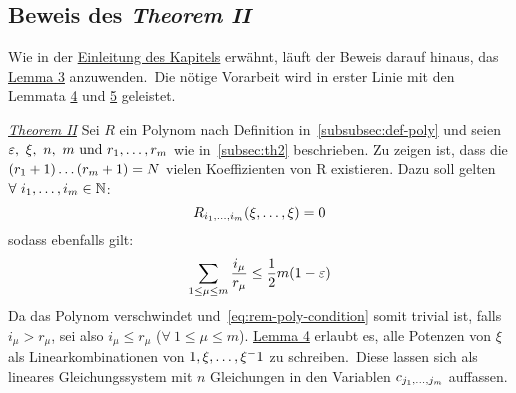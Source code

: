     \subsection{Beweis des \emph{Theorem II}}
        \label{subsec:proof-th2}
        \textrm{Wie in der \hyperref[sec:th2]{Einleitung des Kapitels} erwähnt, läuft der Beweis darauf hinaus, das
        \hyperref[subsec:lemma3]{Lemma 3} anzuwenden.\ Die nötige Vorarbeit wird in erster Linie mit den Lemmata
        \hyperref[subsec:lemma4]{4} und \hyperref[subsec:lemma5]{5} geleistet.}
        \begin{namedproof}{\emph{\hyperref[subsec:th2]{Theorem II}}}
            Sei $R$ ein Polynom nach Definition in~\ref{subsubsec:def-poly} und seien $\varepsilon,\ \xi,\ n,\ m \ \textrm{und}\  r_1, \dots, r_m$ wie in~\ref{subsec:th2} beschrieben.
            \newline
            Zu zeigen ist, dass die $(r_1+1) \dots (r_m+1) = N$ vielen Koeffizienten von R existieren.
            \newline 
            Dazu soll gelten $\forall \ i_1, \dots, i_m \in \mathbb{N}$:
            \begin{equation}
                R_{i_1, \dots, i_m}(\xi, \dots, \xi) = 0 \label{eq:rem-poly-condition}
            \end{equation}
            sodass ebenfalls gilt:
            \begin{equation*}
                \sum_{1 \leq \mu \leq m} \frac{i_\mu}{r_\mu} \leq \frac{1}{2} m(1 - \varepsilon)
            \end{equation*}
            Da das Polynom verschwindet und~\eqref{eq:rem-poly-condition} somit trivial ist, falls $i_\mu > r_\mu$, sei
            also $i_\mu \leq r_\mu$ ($\forall \ 1 \leq \mu \leq m$).
            \hyperref[subsec:lemma4]{Lemma 4} erlaubt es, alle Potenzen von $\xi$ als Linearkombinationen von $1, \xi, \dots, \xi^-1$ zu schreiben.\ Diese lassen sich als lineares Gleichungssystem mit $n$ Gleichungen in den Variablen
            $c_{j_1, \dots, j_m}$ auffassen.
        \end{namedproof}
    
